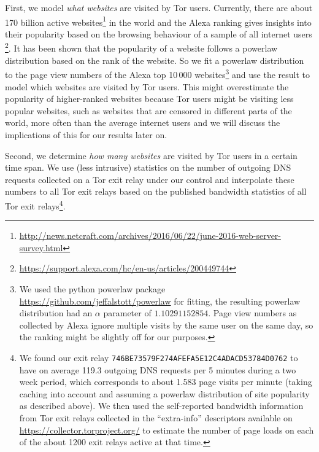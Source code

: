 First, we model \emph{what websites} are visited by Tor users.
Currently, there are about 170 billion active
websites\footnote{\url{http://news.netcraft.com/archives/2016/06/22/june-2016-web-server-survey.html}}
in the world and the Alexa ranking gives insights into their popularity
based on the browsing behaviour of a sample of all internet users
\footnote{\url{https://support.alexa.com/hc/en-us/articles/200449744}}.
It has been shown that the popularity of a website follows a powerlaw
distribution based on the rank of the website. So
we fit a powerlaw distribution to the page view numbers of the Alexa top
10\,000 websites\footnote{We used the python powerlaw package
		\url{https://github.com/jeffalstott/powerlaw} for fitting, the
		resulting powerlaw distribution had an $\alpha$ parameter of
		$1.10291152854$. Page view numbers as collected by Alexa ignore
		multiple visits by the same user on the same day, so the ranking
		might be slightly off for our purposes.} and use the result to
model which websites are visited by Tor users.
This might overestimate the popularity of higher-ranked websites because
Tor users might be visiting less popular websites, such as websites that
are censored in different parts of the world, more often than the
average internet users and we will discuss the implications of this for
our results later on.

Second, we determine \emph{how many websites} are visited by Tor users in a
certain time span. We use (less intrusive) statistics on the number of
outgoing DNS requests collected on a Tor exit relay under our control
and interpolate these numbers to all Tor exit relays based on the
published bandwidth statistics of all Tor exit relays\footnote{We found
		our exit relay \texttt{746BE73579F274AFEFA5E12C4ADACD53784D0762}
		to have on average 119.3 outgoing DNS requests per 5 minutes
		during a two week period, which corresponds to about 1.583 page
		visits per minute (taking caching into account and assuming a
		powerlaw distribution of site popularity as described above). We
		then used the self-reported bandwidth information from Tor exit
		relays collected in the ``extra-info'' descriptors available on
		\url{https://collector.torproject.org/} to estimate the number
		of page loads on each of the about 1200 exit relays active at
		that time.}.


